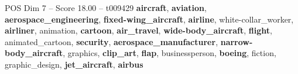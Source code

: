 \begin{textsample}{POS Dim 7 – Score 18.00 – t009429}  \label{ex:f7_pos_024}
\textbf{aircraft}, \textbf{aviation}, \textbf{aerospace\_engineering}, \textbf{fixed-wing\_aircraft}, \textbf{airline}, white-collar\_worker, \textbf{airliner}, animation, \textbf{cartoon}, \textbf{air\_travel}, \textbf{wide-body\_aircraft}, \textbf{flight}, animated\_cartoon, \textbf{security}, \textbf{aerospace\_manufacturer}, \textbf{narrow-body\_aircraft}, graphics, \textbf{clip\_art}, \textbf{flap}, businessperson, \textbf{boeing}, fiction, graphic\_design, \textbf{jet\_aircraft}, \textbf{airbus}

\end{textsample}
